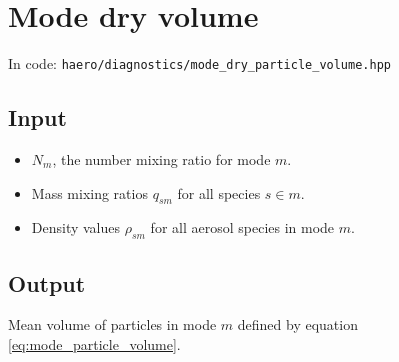 \section{Mode dry volume}

In code: \texttt{haero/diagnostics/mode\_dry\_particle\_volume.hpp}

\subsection{Input}
  \begin{itemize}
    \item $N_m$, the number mixing ratio for mode $m$.
    \item Mass mixing ratios $q_{sm}$ for all species $s\in m$.
    \item Density values $\rho_{sm}$ for all aerosol species in mode $m$.
  \end{itemize}
  
\subsection{Output}
  Mean volume of particles in mode $m$ defined by equation \eqref{eq:mode_particle_volume}.